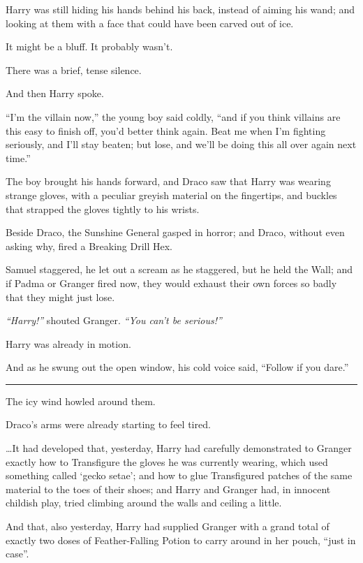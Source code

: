Harry was still hiding his hands behind his back, instead of aiming his
wand; and looking at them with a face that could have been carved out of
ice.

It might be a bluff. It probably wasn't.

There was a brief, tense silence.

And then Harry spoke.

``I'm the villain now,'' the young boy said coldly, ``and if you think
villains are this easy to finish off, you'd better think again. Beat me
when I'm fighting seriously, and I'll stay beaten; but lose, and we'll
be doing this all over again next time.''

The boy brought his hands forward, and Draco saw that Harry was wearing
strange gloves, with a peculiar greyish material on the fingertips, and
buckles that strapped the gloves tightly to his wrists.

Beside Draco, the Sunshine General gasped in horror; and Draco, without
even asking why, fired a Breaking Drill Hex.

Samuel staggered, he let out a scream as he staggered, but he held the
Wall; and if Padma or Granger fired now, they would exhaust their own
forces so badly that they might just lose.

\emph{``Harry!''} shouted Granger. \emph{``You can't be serious!''}

Harry was already in motion.

And as he swung out the open window, his cold voice said, ``Follow if
you dare.''

\begin{center}\rule{3in}{0.4pt}\end{center}

The icy wind howled around them.

Draco's arms were already starting to feel tired.

\ldots{}It had developed that, yesterday, Harry had carefully
demonstrated to Granger exactly how to Transfigure the gloves he was
currently wearing, which used something called `gecko setae'; and how to
glue Transfigured patches of the same material to the toes of their
shoes; and Harry and Granger had, in innocent childish play, tried
climbing around the walls and ceiling a little.

And that, also yesterday, Harry had supplied Granger with a grand total
of exactly two doses of Feather-Falling Potion to carry around in her
pouch, ``just in case''.

